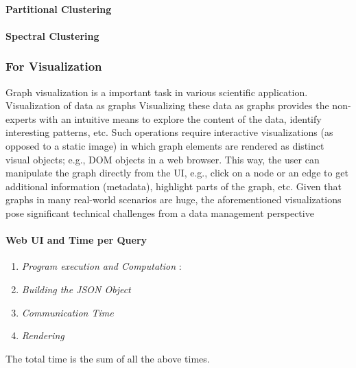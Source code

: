 \paragraph{Partitional Clustering}

\paragraph{Spectral Clustering}





\subsubsection{For  Visualization}
Graph visualization is a important task in various scientific application. Visualization of data as graphs Visualizing these data
as graphs provides the non-experts with an intuitive means
to explore the content of the data, identify interesting patterns,
etc. Such operations require interactive visualizations
(as opposed to a static image) in which graph elements are
rendered as distinct visual objects; e.g., DOM objects in a
web browser. This way, the user can manipulate the graph
directly from the UI, e.g., click on a node or an edge to
get additional information (metadata), highlight parts of the
graph, etc. Given that graphs in many real-world scenarios
are huge, the aforementioned visualizations pose significant
technical challenges from a data management perspective

\paragraph{Web UI and Time per Query}
\begin{enumerate}
\item \textit{Program execution and Computation} : 
\item \textit{Building the JSON Object}
\item \textit{Communication Time}
\item \textit{Rendering }
\end{enumerate}
The total time is the sum of all the above times. 
